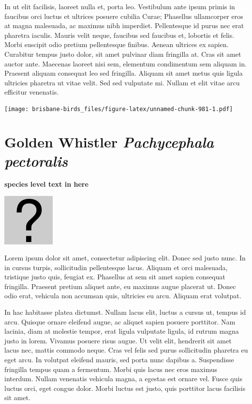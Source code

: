 \documentclass[]{book}
\let\origfigure\figure
\let\endorigfigure\endfigure
\renewenvironment{figure}[1][2] {
  \expandafter\origfigure\expandafter[H]
} {
  \endorigfigure
}
\begin{document}
In ut elit facilisis, laoreet nulla et, porta leo. Vestibulum ante ipsum
primis in faucibus orci luctus et ultrices posuere cubilia Curae;
Phasellus ullamcorper eros at magna malesuada, ac maximus nibh
imperdiet. Pellentesque id purus nec erat pharetra iaculis. Mauris velit
neque, faucibus sed faucibus et, lobortis et felis. Morbi suscipit odio
pretium pellentesque finibus. Aenean ultrices ex sapien. Curabitur
tempus justo dolor, sit amet pulvinar diam fringilla at. Cras sit amet
auctor ante. Maecenas laoreet nisi sem, elementum condimentum sem
aliquam in. Praesent aliquam consequat leo sed fringilla. Aliquam sit
amet metus quis ligula ultricies pharetra ut vitae velit. Sed sed
vulputate mi. Nullam et elit vitae arcu efficitur venenatis.

\begin{figure}
\centering
\texttt{[image: brisbane-birds\_files/figure-latex/unnamed-chunk-981-1.pdf]}
\caption{\label{fig:unnamed-chunk-981}insert figure caption}
\end{figure}

\section{\texorpdfstring{Golden Whistler \emph{Pachycephala
pectoralis}}{Golden Whistler Pachycephala pectoralis}}\label{golden-whistler-pachycephala-pectoralis}

\textbf{species level text in here}

\begin{figure}
\centering
\includegraphics{assets/missing.png}
\caption{No image for species}
\end{figure}

Lorem ipsum dolor sit amet, consectetur adipiscing elit. Donec sed justo
nunc. In in cursus turpis, sollicitudin pellentesque lacus. Aliquam et
orci malesuada, tristique justo quis, feugiat ex. Phasellus at sem sit
amet sapien consequat fringilla. Praesent pretium aliquet ante, eu
maximus augue placerat ut. Donec odio erat, vehicula non accumsan quis,
ultricies eu arcu. Aliquam erat volutpat.

In hac habitasse platea dictumst. Nullam lacus elit, luctus a cursus ut,
tempus id arcu. Quisque ornare eleifend augue, ac aliquet sapien posuere
porttitor. Nam lacinia, diam at molestie tempor, erat ligula vulputate
ligula, id rutrum magna justo in lorem. Vivamus posuere risus augue. Ut
velit elit, hendrerit sit amet lacus nec, mattis commodo neque. Cras vel
felis sed purus sollicitudin pharetra eu eget arcu. In volutpat eleifend
mauris, sed porta nunc dapibus a. Suspendisse fringilla tempus quam a
fermentum. Morbi quis lacus nec eros maximus interdum. Nullam venenatis
vehicula magna, a egestas est ornare vel. Fusce quis luctus orci, eget
congue dolor. Morbi luctus est justo, quis porttitor lacus facilisis sit
amet.
\end{document}
